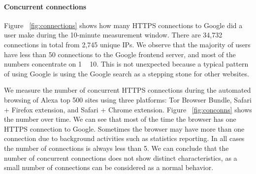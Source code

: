 \documentclass{article}
\begin{document}
\paragraph{Concurrent connections}
Figure ~\ref{fig:connections} shows how many HTTPS connections to Google did a user make 
during the 10-minute measurement window.
There are 34,732 connections in total from 2,745 unique IPs. We observe that the majority of users have less than 
50 connections to the Google frontend server, and most of the numbers concentrate on 1 ~ 10. This is not unexpected
because a typical pattern of using Google is using the Google search as a stepping stone for other websites.

We measure the number of concurrent HTTPS connections during the automated browsing of Alexa
top 500 sites using three platforms: Tor Browser Bundle, Safari + Firefox extension, and Safari + Chrome extension.
Figure ~\ref{fig:conconns} shows the number over time. We can see that most of the time
the browser has one HTTPS connection to Google. Sometimes the browser may have more than one connection
due to background activities such as statistics reporting. In all cases the number of connections is always 
less than 5. We can conclude that the number of concurrent connections does not show distinct characteristics, as 
a small number of connections can be considered as a normal behavior.
\end{document}

